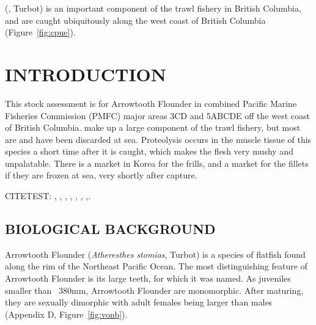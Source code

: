 

\fishname (\emph{\sciencename}, Turbot) is an important component of the trawl fishery in British Columbia, and are caught ubiquitously along the west coast of British Columbia (Figure~\ref{fig:cpue}).

\newpage	%



\clearpage

\setcounter{page}{1}

\section{INTRODUCTION}

This stock assessment is for Arrowtooth Flounder in combined Pacific Marine Fisheries Commission (PMFC) major areas 3CD and 5ABCDE off the west coast of British Columbia. \fishname make up a large component of the trawl fishery, but most are and have been discarded at sea. Proteolysis occurs in the muscle tissue of this species a short time after it is caught, which makes the flesh very mushy and unpalatable. There is a market in Korea for the frills, and a market for the fillets if they are frozen at sea, very shortly after capture.

CITETEST: \citet{arf1995}, \citet{arf1999a}, \citet{arf1999b}, \citet{arf2000}, \citet{arf2001}, \citet{arf2003}, \citet{arf2006},\citet{arf2013}.

\subsection{BIOLOGICAL BACKGROUND}

Arrowtooth Flounder (\emph{Atheresthes stomias}, Turbot) is a species of flatfish found along the rim of the Northeast Pacific Ocean. The most distinguishing feature of Arrowtooth Flounder is its large teeth, for which it was named. As juveniles smaller than ~380mm, Arrowtooth Flounder are monomorphic. After maturing, they are sexually dimorphic with adult females being larger than males (Appendix D, Figure~\ref{fig:vonb}).

